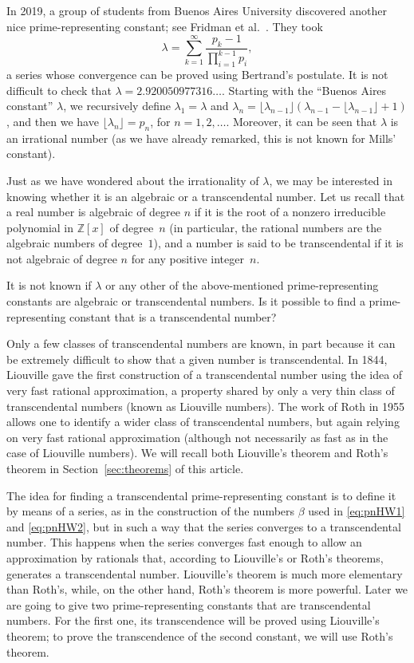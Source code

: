\documentclass{article}
\theoremstyle{plain}
\begin{document}
In 2019, a group of students from Buenos Aires University discovered another nice prime-representing constant; see Fridman et al.~\cite{FGGGT-BA}. 
They took
\[
  \lambda = \sum_{k=1}^{\infty} \frac{p_{k}-1}{\prod_{i=1}^{k-1} p_{i}},
\]
a series whose convergence can be proved using Bertrand's postulate. It is not difficult to check that $\lambda = 2.920050977316\dots$. 
Starting with the ``Buenos Aires constant'' $\lambda$, we recursively define $\lambda_1 = \lambda$ and 
$\lambda_n = \lfloor\lambda_{n-1}\rfloor (\lambda_{n-1} - \lfloor\lambda_{n-1}\rfloor + 1)$,
and then we have $\lfloor\lambda_n\rfloor = p_n$, for $n= 1,2,\dots$. Moreover, it can be seen that $\lambda$ is an irrational number (as we have already remarked, this is not known for Mills' constant).

Just as we have wondered about the irrationality of $\lambda$, we may be interested in knowing whether it is an algebraic or a transcendental number. Let us recall that a real number is algebraic of degree $n$ if it is the root of a nonzero irreducible polynomial in $\mathbb{Z}[x]$ of degree~$n$ (in particular, the rational numbers are the algebraic numbers of degree~$1$), and a number is said to be transcendental if it is not algebraic of degree $n$ for any positive integer~$n$.

It is not known if $\lambda$ or any other of the above-mentioned prime-representing constants are algebraic or transcendental numbers. Is it possible to find a prime-representing constant that is a transcendental number? 

Only a few classes of transcendental numbers are known, in part because it can be extremely difficult to show that a given number is transcendental. In 1844, Liouville gave the first construction of a transcendental number using the idea of very fast rational approximation, a property shared by only a very thin class of transcendental numbers (known as Liouville numbers). The work of Roth in 1955 allows one to identify a wider class of transcendental numbers, but again relying on very fast rational approximation (although not necessarily as fast as in the case of Liouville numbers). We will recall both Liouville's theorem and Roth's theorem in Section~\ref{sec:theorems} of this article.

The idea for finding a transcendental prime-representing constant is to define it by means of a series, as in the construction of the numbers $\beta$ used in \eqref{eq:pnHW1} and \eqref{eq:pnHW2}, but in such a way that the series converges to a transcendental number. This happens when the series converges fast enough to allow an approximation by rationals that, according to Liouville's or Roth's theorems, generates a transcendental number. Liouville's theorem is much more elementary than Roth's, while, on the other hand, Roth's theorem is more powerful. Later we are going to give two prime-representing constants that are transcendental numbers. For the first one, its transcendence will be proved using Liouville's theorem; to prove the transcendence of the second constant, we will use Roth's theorem.
\end{document}

